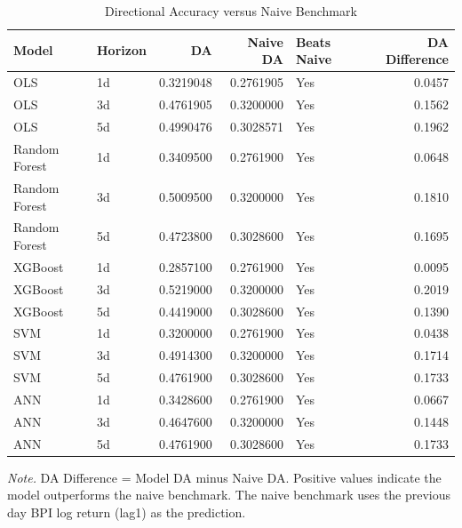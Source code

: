 \begin{table}[!ht]
\centering
\begin{threeparttable}
\caption{Directional Accuracy versus Naive Benchmark}
\label{tab:naive_comparison}

\begin{tabular}{llrrlr}
\toprule
Model & Horizon & DA & Naive DA & Beats Naive & DA Difference\\
\midrule
OLS & 1d & 0.3219048 & 0.2761905 & Yes & 0.0457\\
OLS & 3d & 0.4761905 & 0.3200000 & Yes & 0.1562\\
OLS & 5d & 0.4990476 & 0.3028571 & Yes & 0.1962\\
Random Forest & 1d & 0.3409500 & 0.2761900 & Yes & 0.0648\\
Random Forest & 3d & 0.5009500 & 0.3200000 & Yes & 0.1810\\
Random Forest & 5d & 0.4723800 & 0.3028600 & Yes & 0.1695\\
XGBoost & 1d & 0.2857100 & 0.2761900 & Yes & 0.0095\\
XGBoost & 3d & 0.5219000 & 0.3200000 & Yes & 0.2019\\
XGBoost & 5d & 0.4419000 & 0.3028600 & Yes & 0.1390\\
SVM & 1d & 0.3200000 & 0.2761900 & Yes & 0.0438\\
SVM & 3d & 0.4914300 & 0.3200000 & Yes & 0.1714\\
SVM & 5d & 0.4761900 & 0.3028600 & Yes & 0.1733\\
ANN & 1d & 0.3428600 & 0.2761900 & Yes & 0.0667\\
ANN & 3d & 0.4647600 & 0.3200000 & Yes & 0.1448\\
ANN & 5d & 0.4761900 & 0.3028600 & Yes & 0.1733\\
\bottomrule
\end{tabular}
\begin{tablenotes}
\footnotesize
\item \textit{Note.} DA Difference = Model DA minus Naive DA. Positive values indicate the model outperforms the naive benchmark. The naive benchmark uses the previous day BPI log return (lag1) as the prediction.
\end{tablenotes}
\end{threeparttable}
\end{table}
